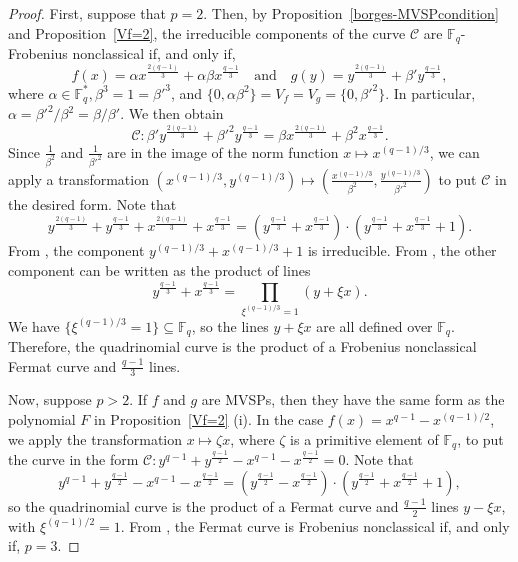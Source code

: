 \documentclass[preprint,12pt]{elsarticle}
\begin{document}
\begin{proof}
First, suppose that $p = 2$. Then, by Proposition~\ref{borges-MVSPcondition} and Proposition~\ref{Vf=2}, the irreducible components of the curve $\mathcal{C}$ are $\mathbb{F}_q$-Frobenius nonclassical if, and only if,
$$
f(x) = \alpha x^{\frac{2(q - 1)}{3}} + \alpha\beta x^{\frac{q - 1}{3}} \quad \text{and} \quad g(y) = y^{\frac{2(q - 1)}{3}} + \beta' y^{\frac{q - 1}{3}},
$$
where $\alpha \in \mathbb{F}_q^*, \beta^3 = 1 = \beta'^3$, and $ \{0, \alpha \beta^2\} = V_f = V_g = \{0, \beta'^2\}$. In particular, $\alpha = \beta'^2/\beta^2= \beta/\beta'$. We then obtain
$$\mathcal{C}: \beta'y^{\frac{2(q-1)}{3}} + \beta'^2 y^{\frac{q-1}{3}} = \beta x^{\frac{2(q-1)}{3}} + \beta^2 x^{\frac{q-1}{3}}.$$
Since $\frac{1}{\beta^2}$ and $\frac{1}{\beta'^2}$ are in the image of the norm function $x \mapsto x^{(q-1)/3}$, we can apply a transformation $(x^{(q-1)/3}, y^{(q-1)/3}) \mapsto \left(\frac{x^{(q-1)/3}}{\beta^2}, \frac{y^{(q-1)/3}}{\beta'^2}\right)$ to put $\mathcal{C}$ in the desired form. Note that
$$y^{\frac{2(q-1)}{3}}+y^{\frac{q-1}{3}}+x^{\frac{2(q-1)}{3}}+x^{\frac{q-1}{3}} = \left(y^{\frac{q-1}{3}} + x^{\frac{q-1}{3}}\right) \cdot \left(y^{\frac{q-1}{3}} + x^{\frac{q-1}{3}} + 1\right).$$
From \cite[Corollary 2.10]{beelen-pelikaan}, the component $y^{(q-1)/3}+x^{(q-1)/3}+1$ is irreducible. From \cite[Corollary 2.5]{beelen-pelikaan}, the other component can be written as the product of lines
$$y^{\frac{q-1}{3}} + x^{\frac{q-1}{3}} = \prod_{\xi^{(q-1)/3}=1}(y + \xi x).$$
We have $\{\xi^{(q-1)/3} = 1\} \subseteq \mathbb{F}_q$, so the lines $y + \xi x$ are all defined over $\mathbb{F}_q$. Therefore, the quadrinomial curve is the product of a Frobenius nonclassical Fermat curve and $\frac{q-1}{3}$ lines.

Now, suppose $p > 2$. If $f$ and $g$ are MVSPs, then they have the same form as the polynomial $F$ in Proposition~\ref{Vf=2} (i). In the case $f(x) = x^{q-1} - x^{(q-1)/2}$, we apply the transformation $x \mapsto \zeta x$, where $\zeta$ is a primitive element of $\mathbb{F}_q$, to put the curve in the form $\mathcal{C}: y^{q-1}+y^{\frac{q-1}{2}}-x^{q-1}-x^{\frac{q-1}{2}} = 0$. Note that
$$y^{q-1}+y^{\frac{q-1}{2}}-x^{q-1}-x^{\frac{q-1}{2}} = \left(y^{\frac{q-1}{2}} - x^{\frac{q-1}{2}}\right) \cdot \left(y^{\frac{q-1}{2}} + x^{\frac{q-1}{2}} + 1\right),$$
so the quadrinomial curve is the product of a Fermat curve and $\frac{q-1}{2}$ lines $y - \xi x$, with $\xi^{(q-1)/2}=1$. From \cite[Theorem 2]{garcia1}, the Fermat curve is Frobenius nonclassical if, and only if, $p = 3$.
\end{proof}
\end{document}
